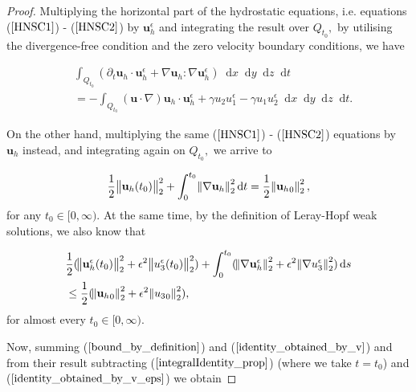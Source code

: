 \documentclass[11pt, a4paper]{article}
\newcommand*\diff{\mathop{}\!\mathrm{d}}
\begin{document}
\begin{proof}

Multiplying the horizontal part of the hydrostatic equations, i.e. equations ($\ref{HNSC1}$) - ($\ref{HNSC2}$) by $\mathbf{u}_h^\epsilon$ and integrating the result over $Q_{t_0},$ by utilising the divergence-free condition and the zero velocity boundary conditions, we have

\begin{equation} \label{identity_obtained_by_v_eps}
\begin{split}
& \int_{Q_{t_0}} (\partial_t \mathbf{u}_h \cdot \mathbf{u}_h^\epsilon + \nabla \mathbf{u}_h : \nabla \mathbf{u}_h^\epsilon) \diff x \diff y \diff z \diff t \\
& = - \int_{Q_{t_0}} (\mathbf{u} \cdot \nabla) \mathbf{u}_h \cdot \mathbf{u}_h^\epsilon + \gamma u_2 u_1^\epsilon - \gamma u_1 u_2^\epsilon \diff x \diff y \diff z \diff t.
\end{split}
\end{equation}

On the other hand, multiplying the same ($\ref{HNSC1}$) - ($\ref{HNSC2}$) equations by $\mathbf{u}_h$ instead, and integrating again on $Q_{t_0},$ we arrive to

\begin{equation} \label{identity_obtained_by_v}
\frac{1}{2} \norm{\mathbf{u}_h(t_0)}_2^2 + \int_0^{t_0} \norm{\nabla \mathbf{u}_h}_2^2 \diff t = \frac{1}{2} \norm{{\mathbf{u}_h}_0}_2^2,
\end{equation}
%
for any $t_0 \in [0, \infty).$ At the same time, by the definition of Leray-Hopf weak solutions, we also know that

\begin{equation} \label{bound_by_definition}
\begin{split}
& \frac{1}{2}( \norm{\mathbf{u}_h^\epsilon (t_0)}_2^2 + \epsilon^2 \norm{u_3^\epsilon(t_0)}_2^2)+ \int_0^{t_0} (\norm{\nabla \mathbf{u}_h^\epsilon}_2^2 + \epsilon^2 \norm{\nabla u_3^\epsilon}_2^2) \diff s \\
& \leq \frac{1}{2} (\norm{{\mathbf{u}_h}_0}_2^2 + \epsilon^2 \norm{{u_3}_0}_2^2),
\end{split}
\end{equation}
%
for almost every $t_0 \in [0, \infty).$

Now, summing ($\ref{bound_by_definition}$) and ($\ref{identity_obtained_by_v}$) and from their result subtracting ($\ref{integralIdentity_prop}$) (where we take $t= t_0$) and ($\ref{identity_obtained_by_v_eps}$) we obtain


\end{proof}
\end{document}
